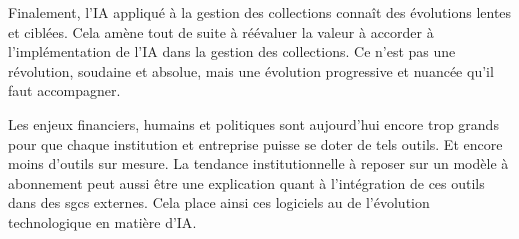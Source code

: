 Finalement, l'\gls{IA} appliqué à la gestion des collections connaît des évolutions lentes et ciblées. Cela amène tout de suite à réévaluer la valeur à accorder à l'implémentation de l'\gls{IA} dans la gestion des collections. Ce n'est pas une révolution, soudaine et absolue, mais une évolution progressive et nuancée qu'il faut accompagner.

Les enjeux financiers, humains et politiques sont aujourd'hui encore trop grands pour que chaque institution et entreprise puisse se doter de tels outils. Et encore moins d'outils sur mesure. La tendance institutionnelle à reposer sur un modèle à abonnement peut aussi être une explication quant à l'intégration de ces outils dans des \glspl{sgc} externes. Cela place ainsi ces logiciels au \coeur de l'évolution technologique en matière d'\gls{IA}. 